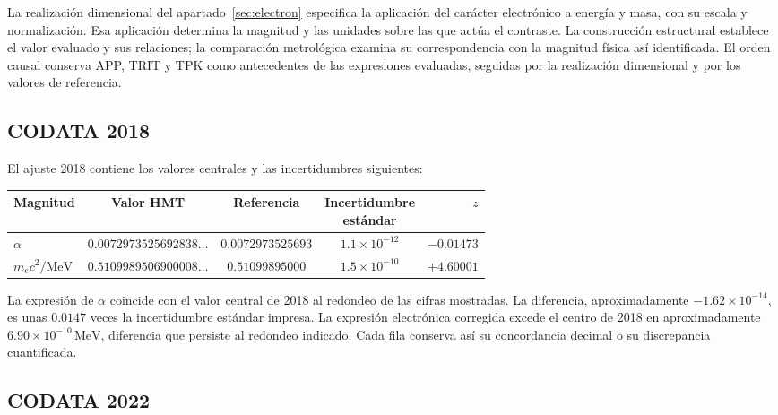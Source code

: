 La realización dimensional del apartado~\ref{sec:electron} especifica la aplicación del carácter electrónico a energía y masa, con su escala y normalización. Esa aplicación determina la magnitud y las unidades sobre las que actúa el contraste. La construcción estructural establece el valor evaluado y sus relaciones; la comparación metrológica examina su correspondencia con la magnitud física así identificada. El orden causal conserva APP, TRIT y TPK como antecedentes de las expresiones evaluadas, seguidas por la realización dimensional y por los valores de referencia.

\subsection{CODATA 2018}

El ajuste 2018 contiene los valores centrales y las incertidumbres siguientes\cite{codata2018}:
\begin{center}
\begin{tabular}{@{}lcccr@{}}\toprule
Magnitud&Valor HMT&Referencia&\shortstack{Incertidumbre\\estándar}&\(z\)\\\midrule
\(\alpha\)&\(0.0072973525692838\ldots\)&\(0.0072973525693\)&\(1.1\times10^{-12}\)&\(-0.01473\)\\
\(m_ec^2/\mathrm{MeV}\)&\(0.5109989506900008\ldots\)&\(0.51099895000\)&\(1.5\times10^{-10}\)&\(+4.60001\)\\\bottomrule
\end{tabular}
\end{center}
La expresión de \(\alpha\) coincide con el valor central de 2018 al redondeo de las cifras mostradas. La diferencia, aproximadamente \(-1.62\times10^{-14}\), es unas \(0.0147\) veces la incertidumbre estándar impresa. La expresión electrónica corregida excede el centro de 2018 en aproximadamente \(6.90\times10^{-10}\,\mathrm{MeV}\), diferencia que persiste al redondeo indicado. Cada fila conserva así su concordancia decimal o su discrepancia cuantificada.



\subsection{CODATA 2022}

